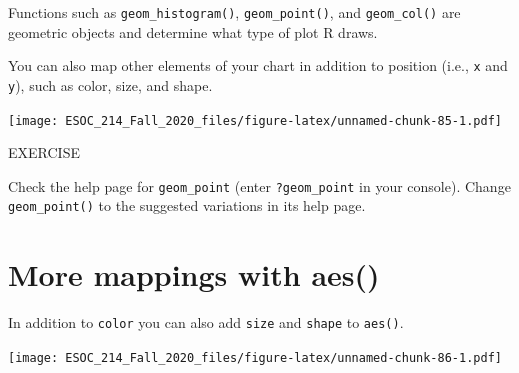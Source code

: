 \documentclass[
]{book}
\newenvironment{Shaded}{\begin{snugshade}}{\end{snugshade}}
\newcommand{\DataTypeTok}[1]{\textcolor[rgb]{0.13,0.29,0.53}{#1}}
\newcommand{\KeywordTok}[1]{\textcolor[rgb]{0.13,0.29,0.53}{\textbf{#1}}}
\newcommand{\NormalTok}[1]{#1}
\newcommand{\OperatorTok}[1]{\textcolor[rgb]{0.81,0.36,0.00}{\textbf{#1}}}
\newcommand{\StringTok}[1]{\textcolor[rgb]{0.31,0.60,0.02}{#1}}
\begin{document}
Functions such as \texttt{geom\_histogram()}, \texttt{geom\_point()}, and \texttt{geom\_col()} are geometric objects and determine what type of plot R draws.

You can also map other elements of your chart in addition to position (i.e., \texttt{x} and \texttt{y}), such as color, size, and shape.

\begin{Shaded}
\end{Shaded}

\texttt{[image: ESOC\_214\_Fall\_2020\_files/figure-latex/unnamed-chunk-85-1.pdf]}

EXERCISE

Check the help page for \texttt{geom\_point} (enter \texttt{?geom\_point} in your console).
Change \texttt{geom\_point()} to the suggested variations in its help page.

\hypertarget{more-mappings-with-aes}{%
\section{More mappings with aes()}\label{more-mappings-with-aes}}

In addition to \texttt{color} you can also add \texttt{size} and \texttt{shape} to \texttt{aes()}.

\begin{Shaded}
\end{Shaded}

\texttt{[image: ESOC\_214\_Fall\_2020\_files/figure-latex/unnamed-chunk-86-1.pdf]}
\end{document}
